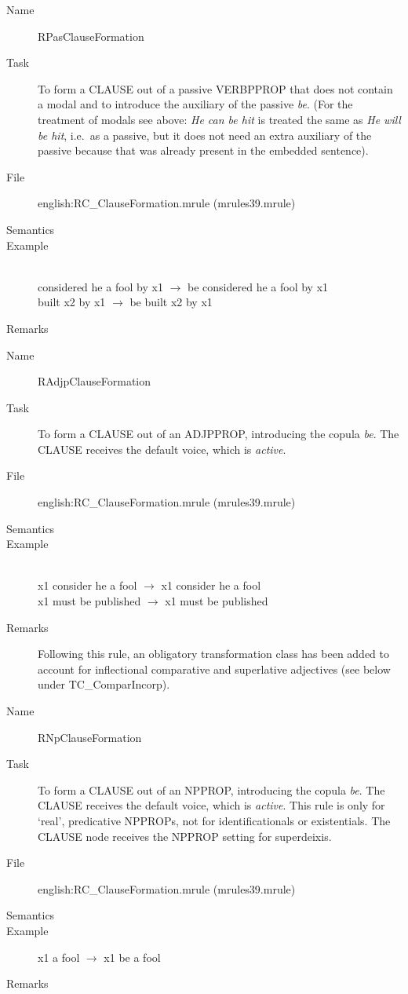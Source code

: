 \begin{description}
\vspace{1 cm}
\begin{description}
\item[Name] RPasClauseFormation
\item[Task] To form a CLAUSE out of a passive VERBPPROP that does not contain a 
modal and to introduce the auxiliary of the passive {\em be\/}. (For the 
treatment of modals see above:
{\em He can be hit\/} is treated the same as {\em He will be hit\/}, i.e.\ as 
a passive, but it does not need an extra auxiliary of the passive because that 
was already present in the embedded sentence).
\item[File] english:RC\_ClauseFormation.mrule (mrules39.mrule)
\item[Semantics]
\item[Example] \mbox{}\\
considered he a fool by x1 $\rightarrow$ be considered he a fool by x1\\
built x2 by x1 $\rightarrow$ be built x2 by x1
\item[Remarks]
\end{description}

\vspace{1 cm}
\begin{description}
\item[Name]   RAdjpClauseFormation
\item[Task] To form a CLAUSE out of an ADJPPROP, introducing the copula 
{\em be\/}. The CLAUSE receives the default voice, which is {\em active\/}.
\item[File] english:RC\_ClauseFormation.mrule (mrules39.mrule)
\item[Semantics]
\item[Example] \mbox{}\\
x1 consider he a fool $\rightarrow$ x1 consider he a fool\\
x1 must be published $\rightarrow$ x1 must be published
\item[Remarks] Following this rule, an obligatory transformation class has been 
added to account for inflectional comparative and superlative adjectives (see 
below under TC\_ComparIncorp).
\end{description}

\vspace{1 cm}
\begin{description}
\item[Name]   RNpClauseFormation
\item[Task] To form a CLAUSE out of an NPPROP, introducing the copula 
{\em be\/}. 
The CLAUSE receives the default voice, which is {\em active\/}. This rule 
is only for `real', predicative NPPROPs, not for identificationals or 
existentials. The CLAUSE node receives the NPPROP setting for superdeixis.
\item[File] english:RC\_ClauseFormation.mrule (mrules39.mrule)
\item[Semantics]
\item[Example] x1 a fool $\rightarrow$ x1 be a fool
\item[Remarks]
\end{description}



\end{description}
